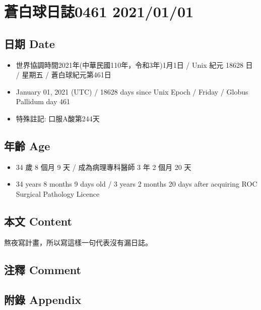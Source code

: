 \documentclass[
]{article}
\author{}
\date{}
\providecommand{\tightlist}{%
  \setlength{\itemsep}{0pt}\setlength{\parskip}{0pt}}
\begin{document}
\hypertarget{ux84bcux767dux7403ux65e5ux8a8c0461-20210101}{%
\section{蒼白球日誌0461
2021/01/01}\label{ux84bcux767dux7403ux65e5ux8a8c0461-20210101}}

\hypertarget{ux65e5ux671f-date}{%
\subsection{日期 Date}\label{ux65e5ux671f-date}}

\begin{itemize}
\tightlist
\item
  世界協調時間2021年(中華民國110年，令和3年)1月1日 / Unix 紀元 18628 日
  / 星期五 / 蒼白球紀元第461日
\item
  January 01, 2021 (UTC) / 18628 days since Unix Epoch / Friday / Globus
  Pallidum day 461
\item
  特殊註記: 口服A酸第244天
\end{itemize}

\hypertarget{ux5e74ux9f61-age}{%
\subsection{年齡 Age}\label{ux5e74ux9f61-age}}

\begin{itemize}
\tightlist
\item
  34 歲 8 個月 9 天 / 成為病理專科醫師 3 年 2 個月 20 天
\item
  34 years 8 months 9 days old / 3 years 2 months 20 days after
  acquiring ROC Surgical Pathology Licence
\end{itemize}

\hypertarget{ux672cux6587-content}{%
\subsection{本文 Content}\label{ux672cux6587-content}}

熬夜寫計畫，所以寫這樣一句代表沒有漏日誌。

\hypertarget{ux6ce8ux91cb-comment}{%
\subsection{注釋 Comment}\label{ux6ce8ux91cb-comment}}

\hypertarget{ux9644ux9304-appendix}{%
\subsection{附錄 Appendix}\label{ux9644ux9304-appendix}}
\end{document}

